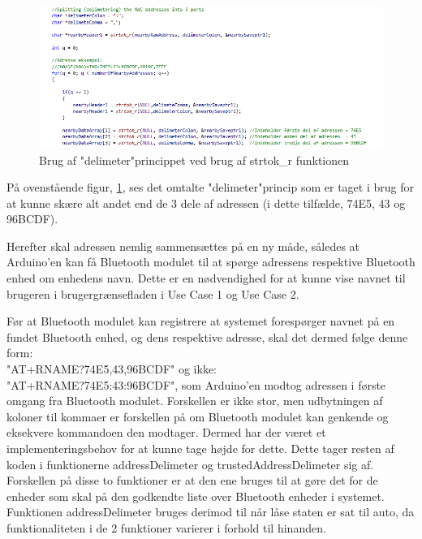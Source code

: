 \begin{figure}[H]
	\centering
	\includegraphics[width = 500 pt]{Img/delimetering.PNG}
	\caption{Brug af "delimeter"\-princippet ved brug af strtok\_r funktionen}
	\label{fig:delimeter}
\end{figure}

På ovenstående figur, \ref{fig:delimeter}, ses det omtalte "delimeter"\-princip som er taget i brug for at kunne skære alt andet end de 3 dele af adressen (i dette tilfælde, 74E5, 43 og 96BCDF).

Herefter skal adressen nemlig sammensættes på en ny måde, således at Arduino'en kan få Bluetooth modulet til at spørge adressens respektive Bluetooth enhed om enhedens navn. Dette er en nødvendighed for at kunne vise navnet til brugeren i brugergrænsefladen i Use Case 1 og Use Case 2.

Før at Bluetooth modulet kan registrere at systemet forespørger navnet på en fundet Bluetooth enhed, og dens respektive adresse, skal det dermed følge denne form:\\ "AT+RNAME?74E5,43,96BCDF" og ikke:\\ "AT+RNAME?74E5:43:96BCDF", som Arduino'en modtog adressen i første omgang fra Bluetooth modulet. Forskellen er ikke stor, men udbytningen af koloner til kommaer er forskellen på om Bluetooth modulet kan genkende og eksekvere kommandoen den modtager. Dermed har der været et implementeringsbehov for at kunne tage højde for dette. Dette tager resten af koden i funktionerne addressDelimeter og trustedAddressDelimeter sig af. Forskellen på disse to funktioner er at den ene bruges til at gøre det for de enheder som skal på den godkendte liste over Bluetooth enheder i systemet. Funktionen addressDelimeter bruges derimod til når låse staten er sat til auto, da funktionaliteten i de 2 funktioner varierer i forhold til hinanden.

